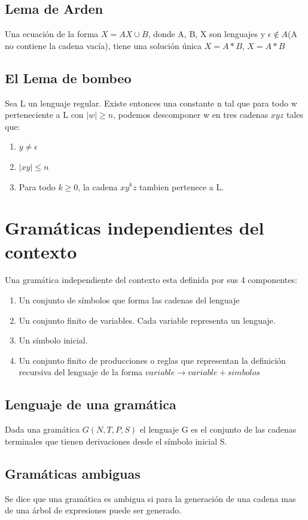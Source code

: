 \documentclass[a4paper,9pt]{extarticle}
\begin{document}
\begin{multicols*}{2}
\subsection{Lema de Arden}
Una ecuación de la forma $X=AX \cup B$, donde A, B, X son lenguajes y $\epsilon \notin A $(A no contiene la cadena vacía), tiene una solución única $X=A*B$, $X=A*B$

\subsection{El Lema de bombeo}
Sea L un lenguaje regular. Existe entonces una constante n tal que para todo w perteneciente a L con $|w| \geq n$, podemos descomponer w en tres cadenas $xyz$ tales que:

\begin{enumerate}
\item $y \neq \epsilon $
\item $|xy| \leq n$
\item Para todo $k \geq 0$, la cadena $xy^kz$ tambien pertenece a L.
\end{enumerate}

\section{Gramáticas independientes del contexto}
Una gramática independiente del contexto esta definida por sus 4 componentes:

\begin{enumerate}
\item Un conjunto de símbolos que forma las cadenas del lenguaje
\item Un conjunto finito de variables. Cada variable representa un lenguaje.
\item Un símbolo inicial.
\item Un conjunto finito de producciones o reglas que representan la definición recursiva del lenguaje de la forma $variable \longrightarrow variable + simbolos$
\end{enumerate}

\subsection{Lenguaje de una gramática}
Dada una gramática $G(N, T, P, S)$ el lenguaje G es el conjunto de las cadenas terminales que tienen derivaciones desde el símbolo inicial S.

\subsection{Gramáticas ambiguas}
Se dice que una gramática es ambigua si para la generación de una cadena mas de una árbol de expresiones puede ser generado.


\end{multicols*}
\end{document}
